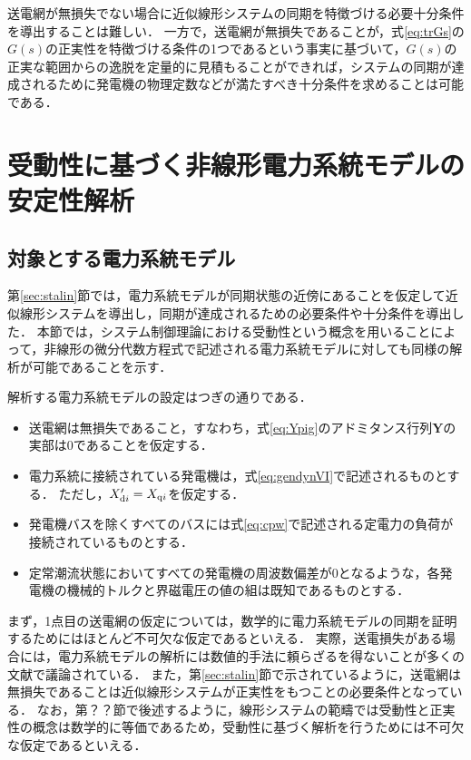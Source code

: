 \documentclass[a4j,10pt,oneside,openany,dvipdfmx]{jsbook}
\begin{document}
送電網が無損失でない場合に近似線形システムの同期を特徴づける必要十分条件を導出することは難しい．
一方で，送電網が無損失であることが，式\eqref{eq:trGs}の$G(s)$の正実性を特徴づける条件の1つであるという事実に基づいて，$G(s)$の正実な範囲からの逸脱を定量的に見積もることができれば，システムの同期が達成されるために発電機の物理定数などが満たすべき十分条件を求めることは可能である．


\section{受動性に基づく非線形電力系統モデルの安定性解析}

\subsection{対象とする電力系統モデル}

第\ref{sec:stalin}節では，電力系統モデルが同期状態の近傍にあることを仮定して近似線形システムを導出し，同期が達成されるための必要条件や十分条件を導出した．
本節では，システム制御理論における受動性という概念を用いることによって，非線形の微分代数方程式で記述される電力系統モデルに対しても同様の解析が可能であることを示す．

解析する電力系統モデルの設定はつぎの通りである．
\begin{itemize}
\item 送電網は無損失であること，すなわち，式\eqref{eq:Ypig}のアドミタンス行列$\bm{Y}$の実部は0であることを仮定する．
\item 電力系統に接続されている発電機は，式\eqref{eq:gendynVI}で記述されるものとする．
ただし，$X_{{\rm d}i}'=X_{{\rm q}i}$を仮定する．
\item 発電機バスを除くすべてのバスには式\eqref{eq:cpw}で記述される定電力の負荷が接続されているものとする．
\item 定常潮流状態においてすべての発電機の周波数偏差が0となるような，各発電機の機械的トルクと界磁電圧の値の組は既知であるものとする．
\end{itemize}
まず，1点目の送電網の仮定については，数学的に電力系統モデルの同期を証明するためにはほとんど不可欠な仮定であるといえる．
実際，送電損失がある場合には，電力系統モデルの解析には数値的手法に頼らざるを得ないことが多くの文献で議論されている\cite{narasimhamurthi1984existence,yang2019distributed}．
また，第\ref{sec:stalin}節で示されているように，送電網は無損失であることは近似線形システムが正実性をもつことの必要条件となっている．
なお，第？？節で後述するように，線形システムの範疇では受動性と正実性の概念は数学的に等価であるため，受動性に基づく解析を行うためには不可欠な仮定であるといえる．
\end{document}
